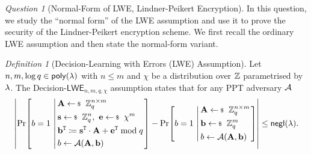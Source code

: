 \documentclass[10pt,twoside]{article}
\theoremstyle{remark}
\newtheorem*{definition*}{Definition}
\newtheorem{question}{Question}
\renewcommand{\vec}[1]{\mathbf{#1}}
\newcommand{\mat}[1]{\mathbf{#1}}
\newcommand{\transpose}{\mathtt{T}}
\newcommand{\LWE}{\mathsf{LWE}}
\begin{document}
\begin{question}[Normal-Form of LWE, Lindner-Peikert Encryption]
    In this question, we study the ``normal form'' of the LWE assumption and use it to prove the security of the Lindner-Peikert encryption scheme. We first recall the ordinary LWE assumption and then state the normal-form variant.
    \begin{definition*}[Decision-Learning with Errors (LWE) Assumption]
        Let $n, m, \log q \in \poly$ with $n \leq m$ and $\chi$ be a distribution over $\mathbb{Z}$ parametrised by $\lambda$.
        The Decision-$\LWE_{n,m,q,\chi}$ assumption states that for any PPT adversary $\mathcal{A}$
        \[
            \abs{
            \condprob{
                b = 1
            }
            {
                \begin{aligned}
                    &\mat{A} \sample \ZZ_q^{n \times m} \\
                    &\vec{s} \sample \ZZ_q^n,~\vec{e} \sample \chi^m \\
                    &\vec{b}^\transpose \coloneqq \vec{s}^\transpose \cdot \mat{A} + \vec{e}^\transpose \bmod q \\
                    &b \gets \adv(\mat{A},\vec{b}) \\
                \end{aligned}
            }
            -
            \condprob{
                b = 1
            }
            {
                \begin{aligned}
                    &\mat{A} \sample \ZZ_q^{n \times m} \\
                    &\vec{b} \sample \ZZ_q^m \\
                    &b \gets \adv(\mat{A},\vec{b}) \\
                \end{aligned}
            }}
            \leq \negl.
        \]
    \end{definition*}


\end{question}
\end{document}
